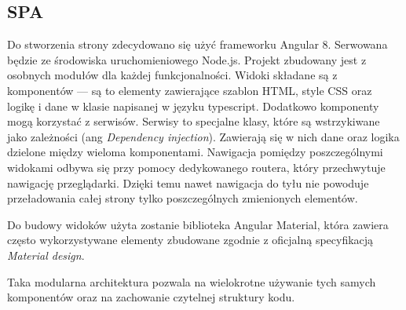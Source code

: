 	\subsection{SPA}
		Do stworzenia strony zdecydowano się użyć frameworku Angular 8.
		Serwowana będzie ze środowiska uruchomieniowego Node.js.
		Projekt zbudowany jest z osobnych modułów dla każdej funkcjonalności.
		Widoki składane są z komponentów --- są to elementy zawierające szablon HTML, style CSS oraz logikę i dane w klasie napisanej w języku typescript.
		Dodatkowo komponenty mogą korzystać z serwisów. Serwisy to specjalne klasy, które są wstrzykiwane jako zależności (ang \emph{Dependency injection}).
		Zawierają się w nich dane oraz logika dzielone między wieloma komponentami.
		Nawigacja pomiędzy poszczególnymi widokami odbywa się przy pomocy dedykowanego routera, który przechwytuje nawigację przeglądarki.
		Dzięki temu nawet nawigacja do tyłu nie powoduje przeładowania całej strony tylko poszczególnych zmienionych elementów.

		Do budowy widoków użyta zostanie biblioteka Angular Material,
		która zawiera często wykorzystywane elementy zbudowane zgodnie z oficjalną specyfikacją \emph{Material design}.

		Taka modularna architektura pozwala na wielokrotne używanie tych samych komponentów oraz na zachowanie czytelnej struktury kodu.
		
